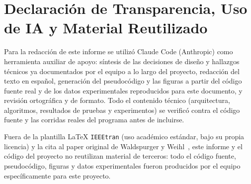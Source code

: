 \section*{Declaración de Transparencia, Uso de IA y Material Reutilizado}

Para la redacción de este informe se utilizó Claude Code (Anthropic) como
herramienta auxiliar de apoyo: síntesis de las decisiones de diseño y
hallazgos técnicos ya documentados por el equipo a lo largo del proyecto,
redacción del texto en español, generación del pseudocódigo y las figuras a
partir del código fuente real y de los datos experimentales reproducidos
para este documento, y revisión ortográfica y de formato. Todo el contenido
técnico (arquitectura, algoritmos, resultados de pruebas y experimentos) se
verificó contra el código fuente y las corridas reales del programa antes
de incluirse.

Fuera de la plantilla LaTeX \texttt{IEEEtran} (uso académico estándar, bajo
su propia licencia) y la cita al paper original de Waldspurger y
Weihl~\cite{Waldspurger1994}, este informe y el código del proyecto no
reutilizan material de terceros: todo el código fuente, pseudocódigo,
figuras y datos experimentales fueron producidos por el equipo
específicamente para este proyecto.
